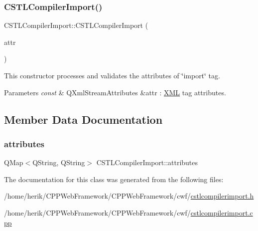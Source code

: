 \subsubsection{\texorpdfstring{C\+S\+T\+L\+Compiler\+Import()}{CSTLCompilerImport()}}
{\footnotesize\ttfamily C\+S\+T\+L\+Compiler\+Import\+::\+C\+S\+T\+L\+Compiler\+Import (\begin{DoxyParamCaption}\item[{const Q\+Xml\+Stream\+Attributes \&}]{attr }\end{DoxyParamCaption})\hspace{0.3cm}{\ttfamily [explicit]}}



This constructor processes and validates the attributes of \char`\"{}import\char`\"{} tag. 


\begin{DoxyParams}{Parameters}
{\em const} & Q\+Xml\+Stream\+Attributes \&attr \+: \hyperlink{namespace_x_m_l}{X\+ML} tag attributes. \\
\hline
\end{DoxyParams}


\subsection{Member Data Documentation}
\mbox{\label{class_c_s_t_l_compiler_import_a7a5f0f43548ad8f6dd24e3d8f2b5a19c}} 
\subsubsection{\texorpdfstring{attributes}{attributes}}
{\footnotesize\ttfamily Q\+Map$<$Q\+String, Q\+String$>$ C\+S\+T\+L\+Compiler\+Import\+::attributes}



The documentation for this class was generated from the following files\+:\begin{DoxyCompactItemize}
\item 
/home/herik/\+C\+P\+P\+Web\+Framework/\+C\+P\+P\+Web\+Framework/cwf/\hyperlink{cstlcompilerimport_8h}{cstlcompilerimport.\+h}\item 
/home/herik/\+C\+P\+P\+Web\+Framework/\+C\+P\+P\+Web\+Framework/cwf/\hyperlink{cstlcompilerimport_8cpp}{cstlcompilerimport.\+cpp}\end{DoxyCompactItemize}
